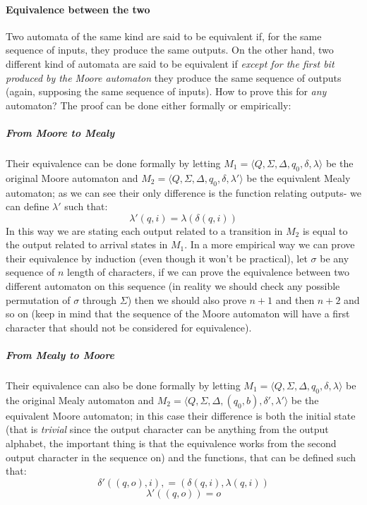 \documentclass{scrartcl}
\begin{document}
    \paragraph{Equivalence between the two} Two automata of the same kind are said to be equivalent if, for the same sequence of inputs, they produce the same outputs. On the other hand, two different kind of automata are said to be equivalent if \emph{except for the first bit produced by the Moore automaton} they produce the same sequence of outputs (again, supposing the same sequence of inputs). How to prove this for \emph{any} automaton? The proof can be done either formally or empirically:
    \subparagraph{From Moore to Mealy} Their equivalence can be done formally by letting $M_1=\langle Q,\Sigma, \Delta, q_0, \delta, \lambda\rangle$ be the original Moore automaton and $M_2=\langle Q, \Sigma, \Delta, q_0, \delta, \lambda'\rangle$ be the equivalent Mealy automaton; as we can see their only difference is the function relating outputs- we can define $\lambda'$ such that:
    \begin{equation*}
        \lambda'(q,i)=\lambda(\delta(q,i))
    \end{equation*}
    In this way we are stating each output related to a transition in $M_2$ is equal to the output related to arrival states in $M_1$.
    In a more empirical way we can prove their equivalence by induction (even though it won't be practical), let $\sigma$ be any sequence of $n$ length of characters, if we can prove the equivalence between two different automaton on this sequence (in reality we should check any possible permutation of $\sigma$ through $\Sigma$) then we should also prove $n+1$ and then $n+2$ and so on (keep in mind that the sequence of the Moore automaton will have a first character that should not be considered for equivalence).
    \subparagraph{From Mealy to Moore} Their equivalence can also be done formally by letting $M_1=\langle Q,\Sigma, \Delta, q_0, \delta, \lambda\rangle$ be the original Mealy automaton and $M_2=\langle Q, \Sigma, \Delta, (q_0,b), \delta', \lambda'\rangle$ be the equivalent Moore automaton; in this case their difference is both the initial state (that is \emph{trivial} since the output character can be anything from the output alphabet, the important thing is that the equivalence works from the second output character in the sequence on) and the functions, that can be defined such that:
    \begin{equation*}
        \delta'((q, o),i), = (\delta(q, i), \lambda(q, i))
    \end{equation*}
    \begin{equation*}
        \lambda'((q, o)) = o
    \end{equation*}
\end{document}

